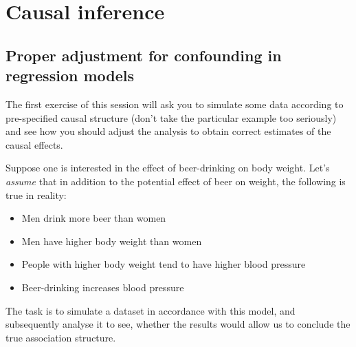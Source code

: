 
\section{Causal inference}
\subsection{Proper adjustment for confounding in regression models}
The first exercise of this session will ask you to simulate some data
according to pre-specified causal structure (don't take the particular
example too seriously) and see how you should adjust the analysis to
obtain correct estimates of the causal effects.

Suppose one is interested in the effect of beer-drinking on body weight.
Let's \textit{assume} that in addition to the potential effect of beer on weight, the following is true in reality:
\begin{itemize}
\item Men drink more beer than women
\item Men have higher body weight than women
\item People with higher body weight tend to have higher blood pressure
\item Beer-drinking increases blood pressure
\end{itemize}

The task is to simulate a dataset in accordance with this model, and
subsequently analyse it to see, whether the results would allow us to
conclude the true association structure.

